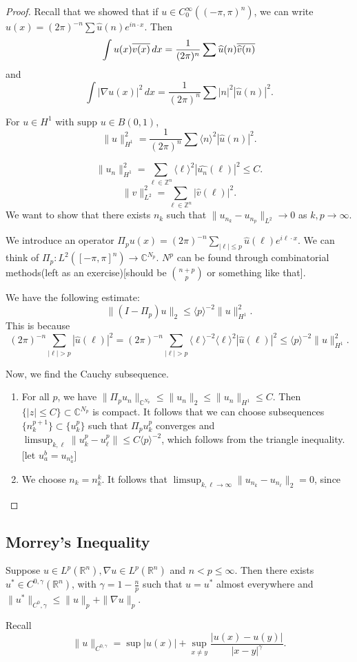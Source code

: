 \documentclass[12pt]{scrartcl}
\newcommand{\Z}{\mathbb{Z}}
\newcommand{\R}{\mathbb{R}}
\newcommand{\C}{\mathbb C}
\renewcommand{\hat}{\widehat}
\newcommand{\<}{\langle}
\renewcommand{\>}{\rangle}
\newcommand{\supp}{\text{supp }}
\let \grad \nabla
\begin{document}
\begin{proof}
Recall that we showed that if $u \in C_0^\infty((-\pi, \pi)^n)$, we can write $u(x) = (2\pi)^{-n} \sum \hat{u}(n) e^{in \cdot x}$.  Then
$$\int u(x)\ol{v(x)}\,dx = \frac{1}{(2\pi)^n}\sum \hat{u}(n) \ol{\hat{v}(n)}$$
and 
$$\int |\grad u(x)|^2\,dx = \frac{1}{(2\pi)^n} \sum |n|^2 |\hat{u}(n)|^2.$$

For $u \in H^1$ with $\supp u \in B(0, 1)$, $$\|u\|_{H^1}^2 = \frac{1}{(2\pi)^n} \sum \<n\>^2 |\hat{u}(n)|^2.$$


$$\|u_n\|_{H^1}^2 = \sum_{\ell \in \Z^n} \<\ell\>^2 |\hat{u_n}(\ell)|^2 \le C.$$
$$\|v\|_{L^2}^2 = \sum_{\ell \in \Z^n} |\hat{v}(\ell)|^2.$$
We want to show that there exists $n_k$ such that $\|u_{n_k} - u_{n_p}\|_{L^2} \to 0$ as $k, p \to \infty$.

We introduce an operator $\Pi_p u(x) = (2\pi)^{-n}\sum_{|\ell| \le p} \hat{u}(\ell) e^{i\ell \cdot x}$.  We can think of $\Pi_p: L^2([-\pi, \pi]^n) \to \C^{N_p}.$
$N^p$ can be found through combinatorial methods(left as an exercise)[should be $\binom{n+p}{p}$ or something like that].

We have the following estimate:
$$\|(I - \Pi_p)u\|_2 \le \<p\>^{-2} \|u\|_{H^1}^2.$$
This is because
 $$(2\pi)^{-n}\sum_{|\ell| > p} |\hat{u}(\ell)|^2 = (2\pi)^{-n}\sum_{|\ell| > p} \<\ell\>^{-2}\<\ell\>^{2}|\hat{u}(\ell)|^2\le \<p\>^{-2} \|u\|_{H^1}^2.$$
 
Now, we find the Cauchy subsequence.  
\begin{enumerate}
\item For all $p$, we have $\|\Pi_p u_n\|_{\C^{N_p}} \le \|u_n\|_2 \le \|u_n\|_{H^1} \le C$.  Then $\{|z| \le C\} \subset \C^{N_p}$ is compact.  It follows that we can choose subsequences $\{n_k^{p+1}\}\subset \{u_{k}^p\}$ such that $\Pi_p u_k^p$ converges and $\limsup_{k, \ell} \|u_{k}^p - u_\ell^p\| \le C\<p\>^{-2}$, which follows from the triangle inequality.   [let $u_a^b = u_{n_a^b}$]
\item We choose $n_k = n_k^k$.  It follows that $\limsup_{k, \ell \to \infty} \|u_{n_k} -u_{n_\ell}\|_2 = 0$, since 
\end{enumerate}
\end{proof}
\subsection{Morrey's Inequality}
\begin{thm}  Suppose $u \in L^p(\R^n), \grad u \in L^p(\R^n)$ and $n < p \le \infty$.  Then there exists $u^* \in C^{0, \gamma}(\R^n)$, with $\gamma = 1 - \frac{n}{p}$ such that $u = u^*$ almost everywhere and $\|u^*\|_{C^0, \gamma} \le \|u\|_p + \|\grad u\|_{p}$.
\end{thm}
\begin{remark}
Recall $$\|u\|_{C^{0, \gamma}} = \sup |u(x)| + \sup_{x \ne y} \frac{|u(x)- u(y)|}{|x - y|^\gamma}.$$
\end{remark}
\end{document}
